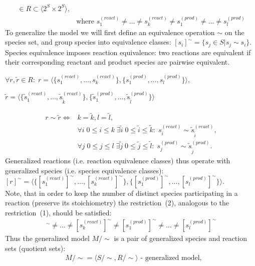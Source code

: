 \documentclass[10pt]{bmc_article}
\newenvironment{bmcformat}{\baselineskip20pt\sloppy\setboolean{publ}{false}}{\baselineskip20pt\sloppy}
\begin{document}
\begin{bmcformat}
\begin{align*}
\in R \subset \langle 2^S \times 2^S \rangle, \\
&\text{where }s^{(react)}_1 \neq \ldots \neq s^{(react)}_k \neq s^{(prod)}_1 \neq \ldots \neq s^{(prod)}_l
\end{align*}
To generalize the model we will first define an equivalence operation $\sim$ on the species set, and group species into equivalence classes: $[s_i]^{\sim} = \{s_j \in S | s_j \sim s_i\}$.\\
Species equivalence imposes reaction equivalence: two reactions are equivalent if their corresponding reactant and product species are pairwise equivalent.
\begin{center}
$\forall r, \tilde{r} \in R:\; r = \langle\{s^{(react)}_1, \ldots, s^{(react)}_k\},\{s^{(prod)}_1, \ldots, s^{(prod)}_l\}\rangle,$
\end{center}
\begin{center}
$\tilde{r} = \langle\{\tilde{s}^{(react)}_1, \ldots, \tilde{s}^{(react)}_{\tilde{k}}\},\{\tilde{s}^{(prod)}_1, \ldots, \tilde{s}^{(prod)}_{\tilde{l}}\}\rangle$
\end{center}
\begin{align*} 
r \sim \tilde{r} \iff & k = \tilde{k}, l = \tilde{l}, \\
& \forall i\; 0\leq{i}\leq{k} \; \exists \tilde{i}\; 0\leq \tilde{i}\leq \tilde{k}:\; s^{(react)}_i \sim \tilde{s}^{(react)}_{\tilde{i}},\\
& \forall j\;0\leq j\leq l\;\exists \tilde{j}\;0\leq \tilde{j}\leq\tilde{l}:\;s^{(prod)}_j \sim \tilde{s}^{(prod)}_{\tilde{j}}.
\end{align*}
Generalized reactions (i.e. reaction equivalence classes) thus operate with generalized species (i.e. species equivalence classes): 
$[r]^{\sim} = \langle\{[s^{(react)}_1]^{\sim}, \ldots, [s^{(react)}_k]^{\sim}\}, \{[s^{(prod)}_1]^{\sim}, \ldots, [s^{(prod)}_l]^{\sim}\}\rangle$.\\
Note, that in order to keep the number of distinct species participating in a reaction (preserve its stoichiometry) the restriction~(2), analogous to the restriction~(1), should be satisfied:
\begin{align}
[s^{(react)}_1]^{\sim} \neq \ldots \neq [s^{(react)}_k]^{\sim} \neq [s^{(prod)}_1]^{\sim} \neq \ldots \neq [s^{(prod)}_l]^{\sim}
\end{align}
Thus the generalized model $M/\sim$ is a pair of generalized species and reaction sets (quotient sets):
\begin{align*} 
&M/\sim = \langle S/\sim, R/\sim \rangle\text{ - generalized model},\\

\end{align*}
\end{bmcformat}
\end{document}
